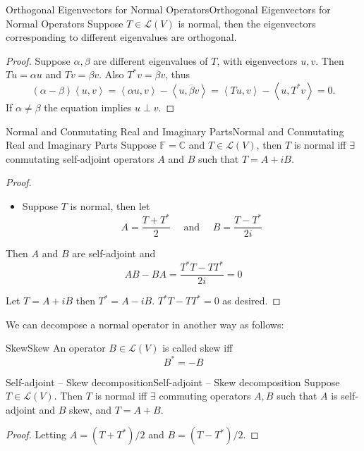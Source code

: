 \documentclass[../main.tex]{subfiles}
\begin{document}
\begin{theorem}{Orthogonal Eigenvectors for Normal Operators}{Orthogonal Eigenvectors for Normal Operators}
Suppose $T\in \mathscr{L}(V)$ is normal, then the eigenvectors corresponding to different eigenvalues are orthogonal.
\end{theorem}
\begin{proof}
Suppose $\alpha,\beta$ are different eigenvalues of $T$, with eigenvectors $u,v$. Then $Tu=\alpha u$ and $Tv=\beta v$. Also $T^*v = \overline{\beta}v$, thus
\begin{equation*}
	(\alpha-\beta)\left<u,v\right> = \left<\alpha u,v\right> - \left<u,\overline{\beta}v\right> = \left<Tu,v\right>- \left<u,T^*v\right> = 0.
\end{equation*}
If $\alpha \neq \beta$ the equation implies $u\perp v$.
\end{proof}

\begin{theorem}{Normal and Conmutating Real and Imaginary Parts}{Normal and Conmutating Real and Imaginary Parts}
Suppose $\mathbb{F}=\mathbb{C}$ and $T\in \mathscr{L}(V)$, then  $T$ is normal iff $\exists $ conmutating self-adjoint operators $A$ and $B$ such that $T=A+iB$.
\end{theorem}
\begin{proof}
\begin{itemize}
\item Suppose $T$ is normal, then let
	\begin{equation*}
	A = \frac{T+T^*}{2} \quad \text{ and }\quad B = \frac{T-T^*}{2i}
	\end{equation*}
\end{itemize}
Then $A$ and $B$ are self-adjoint and
\begin{equation*}
AB-BA = \frac{T^*T-T T^*}{2i}=0
\end{equation*}
\item Let $T=A+iB$ then $T^* = A-iB$. $T ^*T-T T^*=0$ as desired.
\end{proof}

We can decompose a normal operator in another way as follows:
\begin{definition}{Skew}{Skew}
An operator $B\in \mathscr{L}(V)$ is called skew iff
\begin{equation*}
B^*=-B
\end{equation*}
\end{definition}

\begin{theorem}{Self-adjoint -- Skew decomposition}{Self-adjoint -- Skew decomposition}
Suppose $T\in \mathscr{L}(V)$. Then $T$ is normal iff $\exists $ commuting operators $A,B$ such that $A$ is self-adjoint and $B$ skew, and $T=A+B$.
\end{theorem}
\begin{proof}
Letting $A = (T+T^*) / 2$ and $B = (T-T^*) / 2$.
\end{proof}
\end{document}
